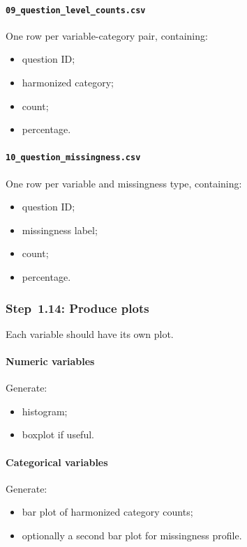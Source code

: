 \documentclass[11pt]{article}
\begin{document}
\paragraph{\texttt{09\_question\_level\_counts.csv}}
One row per variable-category pair, containing:
\begin{itemize}
    \item question ID;
    \item harmonized category;
    \item count;
    \item percentage.
\end{itemize}

\paragraph{\texttt{10\_question\_missingness.csv}}
One row per variable and missingness type, containing:
\begin{itemize}
    \item question ID;
    \item missingness label;
    \item count;
    \item percentage.
\end{itemize}

\subsubsection{Step~1.14: Produce plots}
Each variable should have its own plot.

\paragraph{Numeric variables}
Generate:
\begin{itemize}
    \item histogram;
    \item boxplot if useful.
\end{itemize}

\paragraph{Categorical variables}
Generate:
\begin{itemize}
    \item bar plot of harmonized category counts;
    \item optionally a second bar plot for missingness profile.
\end{itemize}
\end{document}
